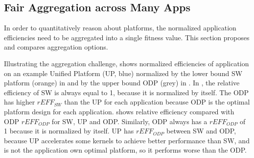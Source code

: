 \vspace{-2pt}
\subsection{Fair Aggregation across Many Apps}
\label{subsec:aggregation}

In order to quantitatively reason about platforms, the normalized application efficiencies need to be aggregated into a single fitness value. This section proposes and compares aggregation options.

Illustrating the aggregation challenge,  shows normalized efficiencies of application on an example Unified Platform (UP, blue) normalized by the lower bound SW platform (orange) in  and by the upper bound ODP (grey) in . In , the relative efficiency of SW is always equal to 1, because it is normalized by itself. The ODP has higher $rEFF_{SW}$ than the UP for each application because ODP is the optimal platform design for each application.  shows relative efficiency compared with ODP $rEFF_{ODP}$ for SW, UP and ODP. Similarly, ODP always has a $rEFF_{ODP}$ of 1 because it is normalized by itself. UP has $rEFF_{ODP}$ between SW and ODP, because UP accelerates some kernels to achieve better performance than SW, and is not the application own optimal platform, so it performs worse than the ODP.






   








